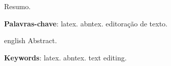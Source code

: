 
\begin{resumo}
    Resumo.

    \vspace{\onelineskip}
    \noindent
    \textbf{Palavras-chave}: latex. abntex. editoração de texto.
\end{resumo}

\begin{resumo}[Abstract]
    \begin{otherlanguage*}{english}
        Abstract.

        \vspace{\onelineskip}
        \noindent
        \textbf{Keywords}: latex. abntex. text editing.
    \end{otherlanguage*}
\end{resumo}
